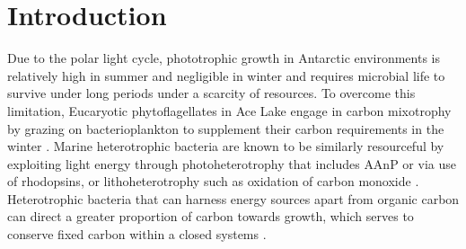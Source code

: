 \section{Introduction}
Due to the polar light cycle, phototrophic growth in Antarctic environments is relatively high in summer and negligible in winter \cite{Laybourn-Parry2005} and requires microbial life to survive under long periods under a scarcity of resources.
To overcome this limitation, Eucaryotic phytoflagellates in Ace Lake engage in carbon mixotrophy by grazing on bacterioplankton to supplement their carbon requirements in the winter \cite{Laybourn-Parry2005}.
Marine heterotrophic bacteria are known to be similarly resourceful by exploiting light energy through photoheterotrophy that includes \ac{AAnP} or via use of rhodopsins, or lithoheterotrophy such as oxidation of carbon monoxide \cite{Moran2007b}.
Heterotrophic bacteria that can harness energy sources apart from organic carbon can direct a greater proportion of carbon towards growth, which serves to conserve fixed carbon within a closed systems \cite{Moran2007b}. 

